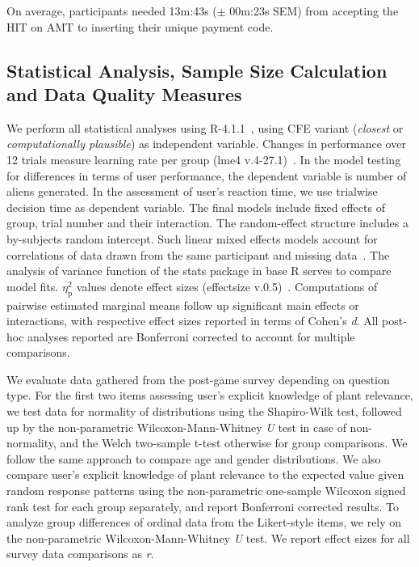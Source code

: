 On average, participants needed 13m:43s ($\pm$ 00m:23s SEM) from accepting the HIT on AMT to inserting their unique payment code.

\subsection{Statistical Analysis, Sample Size Calculation and Data Quality Measures}

We perform all statistical analyses using R-4.1.1~\citep{r_core_team_r_2021}, using \gls{CFE} variant (\textit{closest} or \textit{computationally plausible}) as independent variable.
Changes in performance over 12 trials measure learning rate per group (lme4 v.4-27.1)~\citep{bates_fitting_2015}.
In the model testing for differences in terms of user performance, the dependent variable is number of aliens generated. 
In the assessment of user's reaction time, we use trialwise decision time as dependent variable.
The final models include fixed effects of group, trial number and their interaction. The random-effect structure includes a by-subjects random intercept. 
Such linear mixed effects models account for correlations of data drawn from the same participant and missing data~\citep{detry_analyzing_2016,muth_alternative_2016}.
The analysis of variance function of the stats package in base R serves to compare model fits.
$\eta_{\text{p}}^{2}$ values denote effect sizes (effectsize v.0.5)~\citep{ben-shachar_effectsize_2020}.
Computations of pairwise estimated marginal means follow up significant main effects or interactions, with respective effect sizes reported in terms of Cohen's \textit{d}.
All post-hoc analyses reported are Bonferroni corrected to account for multiple comparisons.

We evaluate data gathered from the post-game survey depending on question type.
For the first two items assessing user's explicit knowledge of plant relevance, we test data for normality of distributions using the Shapiro-Wilk test, followed up by the non-parametric Wilcoxon-Mann-Whitney \textit{U} test in case of non-normality, and the Welch two-sample t-test otherwise for group comparisons. 
We follow the same approach to compare age and gender distributions.
We also compare user's explicit knowledge of plant relevance to the expected value given random response patterns using the non-parametric one-sample Wilcoxon signed rank test for each group separately, and report Bonferroni corrected results.
To analyze group differences of ordinal data from the Likert-style items, we rely on the non-parametric Wilcoxon-Mann-Whitney \textit{U} test.
We report effect sizes for all survey data comparisons as \textit{r}.

